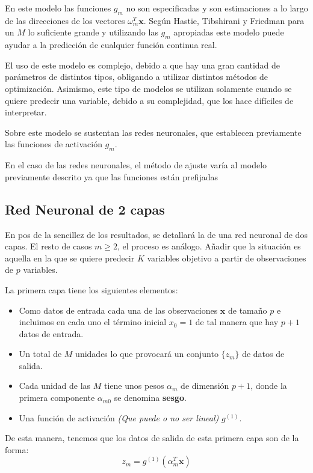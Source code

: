 \noindent En este modelo las funciones $g_m$ no son especificadas y son estimaciones a lo largo de las direcciones de los vectores $\omega_m^T \textbf{x}$. Según Hastie, Tibshirani y Friedman \cite{Hastie 2001} para un $M$ lo suficiente grande y utilizando las $g_m$ apropiadas este modelo puede ayudar a la predicción de cualquier función continua real. 


\noindent El uso de este modelo es complejo, debido a que hay una gran cantidad de parámetros de distintos tipos, obligando a utilizar distintos métodos de optimización. Asimismo, este tipo de modelos se utilizan solamente cuando se quiere predecir una variable, debido a su complejidad, que los hace difíciles de interpretar.

\noindent Sobre este modelo se sustentan las redes neuronales, que establecen previamente las funciones de activación $g_m$.

\noindent En el caso de las redes neuronales, el método de ajuste varía al modelo previamente descrito ya que las funciones están prefijadas 


\subsection{Red Neuronal de 2 capas }

\noindent En pos de la sencillez de los resultados, se detallará la  de una red neuronal de dos capas. El resto de casos $m\geq 2$, el proceso es análogo. Añadir que la situación es aquella en la que se quiere predecir $K$ variables objetivo a partir de observaciones de $p$ variables. 

\noindent La primera capa tiene los siguientes elementos:
\begin{itemize}
\item Como datos de entrada cada una de las observaciones $\textbf{x}$ de tamaño $p$ e incluimos en cada uno el término inicial $x_{0}=1$ de tal manera que hay $p+1$ datos de entrada.
\item Un total de $M$ unidades lo que provocará un conjunto $\lbrace z_m \rbrace$ de datos de salida.
\item Cada unidad de las $M$ tiene unos pesos $\alpha_m$ de dimensión $p+1$, donde la primera componente $\alpha_{m0}$ se denomina \textbf{sesgo}.
\item Una función de activación \textit{(Que puede o no ser lineal)} $g^{(1)}$.
\end{itemize}
\noindent De esta manera, tenemos que los datos de salida de esta primera capa son de la forma:
\begin{equation}
z_m=g^{(1)}(\alpha_m^T\textbf{x})
\end{equation}

